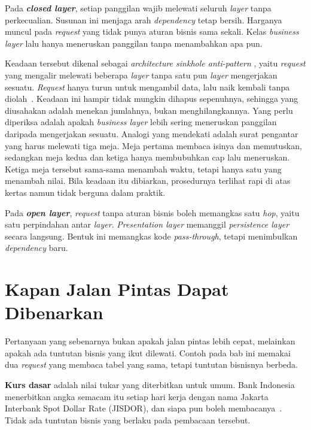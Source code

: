 Pada \textbf{\textit{closed layer}}, setiap panggilan wajib melewati seluruh \textit{layer}
tanpa perkecualian. Susunan ini menjaga arah \textit{dependency} tetap bersih.
Harganya muncul pada \textit{request} yang tidak punya aturan bisnis sama sekali.
Kelas \textit{business layer} lalu hanya meneruskan panggilan tanpa menambahkan apa pun.

Keadaan tersebut dikenal sebagai \textit{architecture sinkhole
anti-pattern}%
,
yaitu \textit{request} yang mengalir melewati beberapa \textit{layer} tanpa satu pun \textit{layer}
mengerjakan sesuatu. \textit{Request} hanya turun untuk mengambil data, lalu naik
kembali tanpa diolah~\cite{richards2020fundamentals}. Keadaan ini hampir tidak
mungkin dihapus sepenuhnya, sehingga yang diusahakan adalah menekan jumlahnya,
bukan menghilangkannya. Yang perlu diperiksa adalah apakah \textit{business layer} lebih
sering meneruskan panggilan daripada mengerjakan sesuatu.
Analogi yang mendekati adalah surat pengantar yang harus melewati tiga meja.
Meja pertama membaca isinya dan memutuskan, sedangkan meja kedua dan ketiga
hanya membubuhkan cap lalu meneruskan. Ketiga meja tersebut sama-sama menambah
waktu, tetapi hanya satu yang menambah nilai. Bila keadaan itu dibiarkan,
prosedurnya terlihat rapi di atas kertas namun tidak berguna dalam praktik.


Pada \textbf{\textit{open layer}}, \textit{request} tanpa aturan bisnis boleh memangkas
satu \textit{hop}, yaitu satu perpindahan antar \textit{layer}.
\textit{Presentation layer} memanggil \textit{persistence layer} secara langsung.
Bentuk ini memangkas kode
\textit{pass-through}, tetapi menimbulkan
\textit{dependency} baru.

\section{Kapan Jalan Pintas Dapat Dibenarkan}

Pertanyaan yang sebenarnya bukan apakah jalan pintas lebih cepat, melainkan
apakah ada tuntutan bisnis yang ikut dilewati. Contoh pada bab ini memakai dua
\textit{request} yang membaca tabel yang sama, tetapi tuntutan bisnisnya berbeda.

\textbf{Kurs dasar} adalah nilai tukar yang diterbitkan untuk umum. Bank
Indonesia menerbitkan angka semacam itu setiap hari kerja dengan nama Jakarta
Interbank Spot Dollar Rate (JISDOR), dan siapa pun boleh
membacanya~\cite{bi2026kurs}. Tidak ada
tuntutan bisnis yang berlaku pada pembacaan tersebut.

